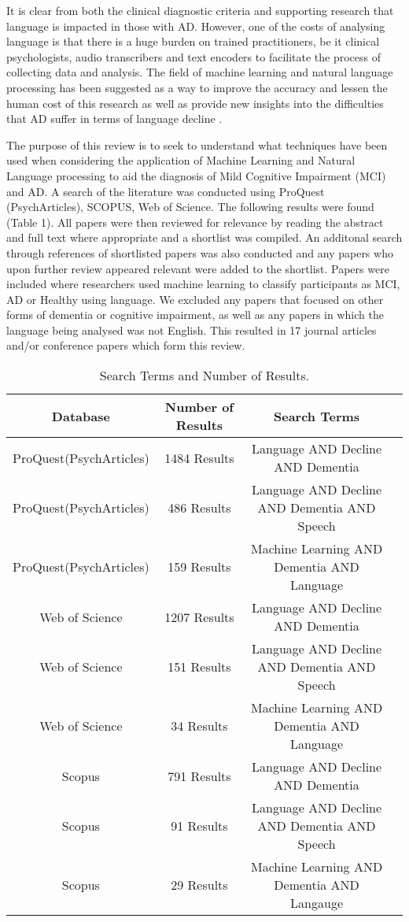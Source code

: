 \documentclass[a4paper]{article}
\begin{document}
\par
It is clear from both the clinical diagnostic criteria and supporting research that language is impacted in those with AD. However, one of the costs of analysing language is that there is a huge burden on trained practitioners, be it clinical psychologists, audio transcribers and text encoders to facilitate the process of collecting data and analysis. The field of machine learning and natural language processing has been suggested as a way to improve the accuracy and lessen the human cost of this research as well as provide new insights into the difficulties that AD suffer in terms of language decline \cite{Boschi2017}. \newline
\par  
The purpose of this review is to seek to understand what techniques have been used when considering the application of Machine Learning and Natural Language processing to aid the diagnosis of Mild Cognitive Impairment (MCI) and AD. A search of the literature was conducted using ProQuest (PsychArticles), SCOPUS, Web of Science. The following results were found (Table 1). All papers were then reviewed for relevance by reading the abstract and full text where appropriate and a shortlist was compiled. An additonal search through references of shortlisted papers was also conducted and any papers who upon further review appeared relevant were added to the shortlist. Papers were included where researchers used machine learning to classify participants as MCI, AD or Healthy using language. We excluded any papers that focused on other forms of dementia or cognitive impairment, as well as any papers in which the language being analysed was not English. This resulted in 17 journal articles and/or conference papers which form this review.

\begin{table}
	\begin{tabular}{ | c | c | c | p{1cm} |}
		\hline
		Database & Number of Results & Search Terms  \\ \hline
		ProQuest(PsychArticles) & 1484 Results & Language AND Decline AND Dementia \\ \hline
		ProQuest(PsychArticles) & 486 Results  & Language AND Decline AND Dementia AND Speech \\ \hline
		ProQuest(PsychArticles) & 159 Results & Machine Learning AND Dementia AND Language \\ \hline
		Web of Science & 1207 Results  & Language AND Decline AND Dementia   \\ \hline
		Web of Science & 151 Results  & Language AND Decline AND Dementia AND Speech  \\ \hline
		Web of Science & 34 Results & Machine Learning AND Dementia AND Language \\ \hline
		Scopus & 791 Results & Language AND Decline AND Dementia  \\ \hline
		Scopus & 91 Results & Language AND Decline AND Dementia AND Speech   \\ \hline
		Scopus & 29 Results & Machine Learning AND Dementia AND Langauge \\ \hline
	\end{tabular}
	\caption{\label{tab:table-name}Search Terms and Number of Results.}
\end{table}
\end{document}
